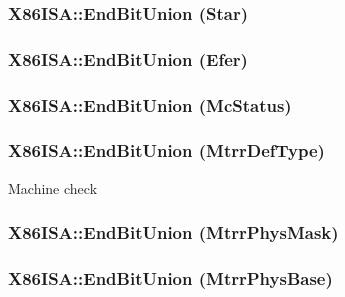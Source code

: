 \label{namespaceX86ISA_ab054845e6a36ccb566b48f94aeca21b4}
\hypertarget{namespaceX86ISA_a668f00fcbee02b4d057d64c22cf7e7a5}{
\subsubsection[{EndBitUnion}]{\setlength{\rightskip}{0pt plus 5cm}X86ISA::EndBitUnion (Star)}}
\label{namespaceX86ISA_a668f00fcbee02b4d057d64c22cf7e7a5}
\hypertarget{namespaceX86ISA_a0a2f3997f942dfaad353244cee4d010e}{
\subsubsection[{EndBitUnion}]{\setlength{\rightskip}{0pt plus 5cm}X86ISA::EndBitUnion (Efer)}}
\label{namespaceX86ISA_a0a2f3997f942dfaad353244cee4d010e}
\hypertarget{namespaceX86ISA_a79917c072640e1ffeaeeb0e615248677}{
\subsubsection[{EndBitUnion}]{\setlength{\rightskip}{0pt plus 5cm}X86ISA::EndBitUnion (McStatus)}}
\label{namespaceX86ISA_a79917c072640e1ffeaeeb0e615248677}
\hypertarget{namespaceX86ISA_af1aa75957bd1b168f5e292fbe13b2465}{
\subsubsection[{EndBitUnion}]{\setlength{\rightskip}{0pt plus 5cm}X86ISA::EndBitUnion (MtrrDefType)}}
\label{namespaceX86ISA_af1aa75957bd1b168f5e292fbe13b2465}
Machine check \hypertarget{namespaceX86ISA_ada1121919d9bca5206c4fda19dcb1cd3}{
\subsubsection[{EndBitUnion}]{\setlength{\rightskip}{0pt plus 5cm}X86ISA::EndBitUnion (MtrrPhysMask)}}
\label{namespaceX86ISA_ada1121919d9bca5206c4fda19dcb1cd3}
\hypertarget{namespaceX86ISA_a104adc3f41d2497c9d77064215abdf8f}{
\subsubsection[{EndBitUnion}]{\setlength{\rightskip}{0pt plus 5cm}X86ISA::EndBitUnion (MtrrPhysBase)}}
